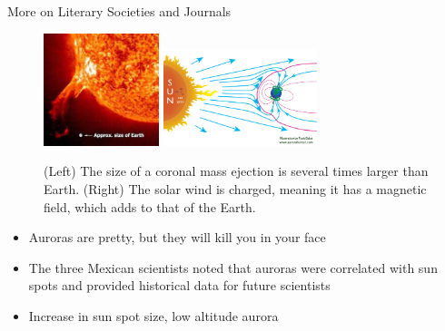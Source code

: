\documentclass{beamer}
\begin{document}
\begin{frame}{More on Literary Societies and Journals}
\small
\begin{figure}
\includegraphics[width=0.3\textwidth]{figures/earth-flare.jpg}
\includegraphics[width=0.4\textwidth]{figures/how-the-auroras-form.png}
\caption{(Left) The size of a coronal mass ejection is several times larger than Earth. (Right) The solar wind is charged, meaning it has a magnetic field, which adds to that of the Earth.}
\end{figure}
\begin{itemize}
\item Auroras are pretty, but they will kill you in your face
\item The three Mexican scientists noted that auroras were correlated with sun spots and provided historical data for future scientists
\item Increase in sun spot size, low altitude aurora
\end{itemize}
\end{frame}
\end{document}
